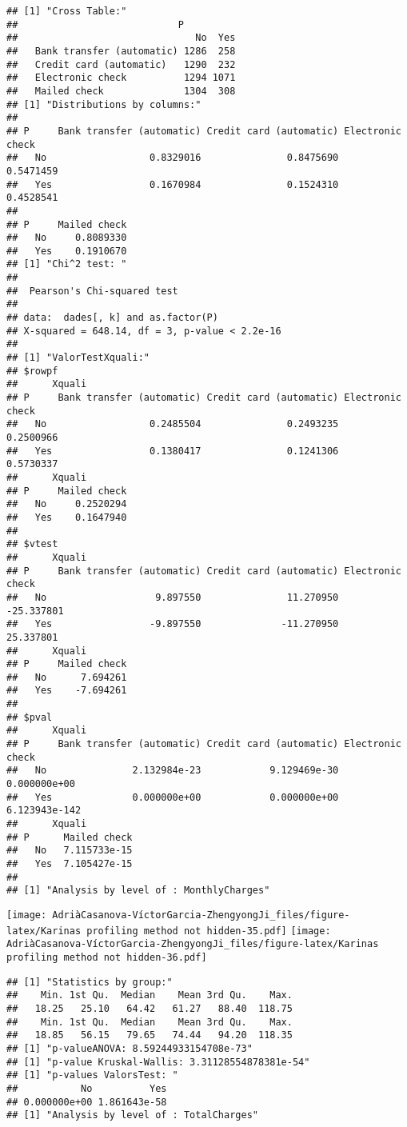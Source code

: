 \documentclass[
]{article}
\begin{document}
\begin{verbatim}
## [1] "Cross Table:"
##                            P
##                               No  Yes
##   Bank transfer (automatic) 1286  258
##   Credit card (automatic)   1290  232
##   Electronic check          1294 1071
##   Mailed check              1304  308
## [1] "Distributions by columns:"
##      
## P     Bank transfer (automatic) Credit card (automatic) Electronic check
##   No                  0.8329016               0.8475690        0.5471459
##   Yes                 0.1670984               0.1524310        0.4528541
##      
## P     Mailed check
##   No     0.8089330
##   Yes    0.1910670
## [1] "Chi^2 test: "
## 
##  Pearson's Chi-squared test
## 
## data:  dades[, k] and as.factor(P)
## X-squared = 648.14, df = 3, p-value < 2.2e-16
## 
## [1] "ValorTestXquali:"
## $rowpf
##      Xquali
## P     Bank transfer (automatic) Credit card (automatic) Electronic check
##   No                  0.2485504               0.2493235        0.2500966
##   Yes                 0.1380417               0.1241306        0.5730337
##      Xquali
## P     Mailed check
##   No     0.2520294
##   Yes    0.1647940
## 
## $vtest
##      Xquali
## P     Bank transfer (automatic) Credit card (automatic) Electronic check
##   No                   9.897550               11.270950       -25.337801
##   Yes                 -9.897550              -11.270950        25.337801
##      Xquali
## P     Mailed check
##   No      7.694261
##   Yes    -7.694261
## 
## $pval
##      Xquali
## P     Bank transfer (automatic) Credit card (automatic) Electronic check
##   No               2.132984e-23            9.129469e-30     0.000000e+00
##   Yes              0.000000e+00            0.000000e+00    6.123943e-142
##      Xquali
## P      Mailed check
##   No   7.115733e-15
##   Yes  7.105427e-15
## 
## [1] "Analysis by level of : MonthlyCharges"
\end{verbatim}

\texttt{[image: AdriàCasanova-VíctorGarcia-ZhengyongJi\_files/figure-latex/Karinas profiling method not hidden-35.pdf]}
\texttt{[image: AdriàCasanova-VíctorGarcia-ZhengyongJi\_files/figure-latex/Karinas profiling method not hidden-36.pdf]}

\begin{verbatim}
## [1] "Statistics by group:"
##    Min. 1st Qu.  Median    Mean 3rd Qu.    Max. 
##   18.25   25.10   64.42   61.27   88.40  118.75 
##    Min. 1st Qu.  Median    Mean 3rd Qu.    Max. 
##   18.85   56.15   79.65   74.44   94.20  118.35 
## [1] "p-valueANOVA: 8.59244933154708e-73"
## [1] "p-value Kruskal-Wallis: 3.31128554878381e-54"
## [1] "p-values ValorsTest: "
##           No          Yes 
## 0.000000e+00 1.861643e-58 
## [1] "Analysis by level of : TotalCharges"
\end{verbatim}
\end{document}

